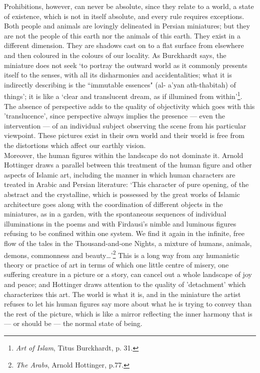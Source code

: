 \documentclass[10pt, twoside]{book}
\begin{document}
Prohibitions, however, can never be absolute, since they relate to a world, a state of existence, 
which is not in itself absolute, and every rule requires exceptions. Both people and animals are 
lovingly delineated in Persian miniatures; but they are not the people of this earth nor the animals 
of this earth. They exist in a different dimension. They are shadows cast on to a flat surface from 
elsewhere and then coloured in the colours of our locality. As Burckhardt says, the miniature does 
not seek `to portray the outward world as it commonly presents itself to the senses, with all its 
disharmonies and accidentalities; what it is indirectly describing is the ``immutable essences" (al\hyp{}
a'yan ath\hyp{}thabitah) of things'; it is like a `clear and translucent dream, as if illumined from 
within'\footnote{\emph{Art of Islam}, Titus Burckhardt, p. 31.}. The absence of perspective adds to the quality of objectivity which goes with this 
'translucence', since perspective always implies the presence --- even the intervention --- of an 
individual subject observing the scene from his particular viewpoint. These pictures exist in their 
own world and their world is free from the distortions which affect our earthly vision. \\

Moreover, the human figures within the landscape do not dominate it. Arnold Hottinger draws a 
parallel between this treatment of the human figure and other aspects of Islamic art, including the 
manner in which human characters are treated in Arabic and Persian literature: `This character of 
pure opening, of the abstract and the crystalline, which is possessed by the great works of Islamic 
architecture goes along with the coordination of different objects in the miniatures, as in a garden, 
with the spontaneous sequences of individual illuminations in the poems and with Firdausi's nimble 
and luminous figures refusing to be confined within one system. We find it again in the infinite, 
free flow of the tales in the Thousand\hyp{}and\hyp{}one Nights, a mixture of humans, animals, demons, 
commonness and beauty\ldots{}'\footnote{\emph{The Arabs}, Arnold Hottinger, p.77.} This is a long way from any humanistic theory or practice of art in 
terms of which one little centre of misery, one suffering creature in a picture or a story, can 
cancel out a whole landscape of joy and peace; and Hottinger draws attention to the quality of 
'detachment' which characterizes this art. The world is what it is, and in the miniature the artist 
refuses to let his human figures say more about what he is trying to convey than the rest of the 
picture, which is like a mirror reflecting the inner harmony that is --- or should be --- the normal 
state of being. \\
\end{document}

